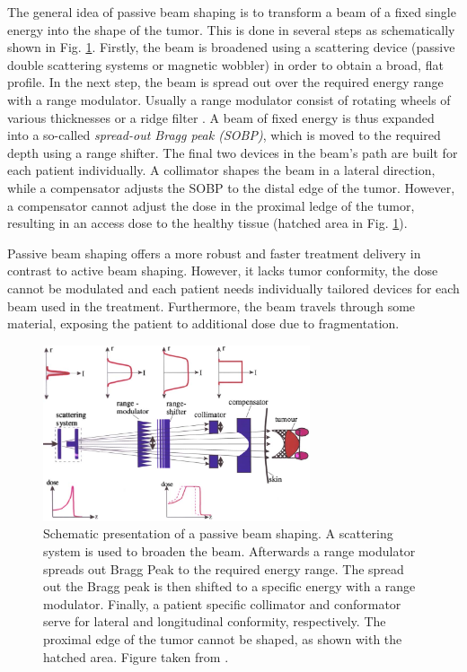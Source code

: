 The general idea of passive beam shaping is to transform a beam of a fixed single energy into the shape of the tumor. This is done in several steps as schematically shown in Fig. \ref{passive}. Firstly, the beam is broadened using a scattering device (passive double scattering systems or magnetic wobbler)
in order to obtain a broad, flat profile. In the next step, the beam is spread out over the required energy range with a range modulator. Usually a range modulator consist of rotating wheels of various thicknesses or a ridge filter \cite{Chu1993}. A beam of fixed energy is thus expanded into a so-called \textit{spread-out Bragg peak (SOBP)}, which is moved to the required depth using a range shifter. The final two devices in the beam's path are built for each patient individually. A collimator shapes the beam in a lateral direction, while a compensator adjusts the SOBP to the distal edge of the tumor. However, a compensator cannot adjust the dose in the proximal ledge of the tumor, resulting in an access dose to the healthy tissue (hatched area in Fig. \ref{passive}).
 
Passive beam shaping offers a more robust and faster treatment delivery in contrast to active beam shaping. However, it lacks tumor conformity, the dose cannot be modulated and each patient needs individually tailored devices for each beam used in the treatment.
 Furthermore, the beam travels through some material, exposing the patient to additional dose due to fragmentation.

 \newpage
 
\begin{figure}[H]
\begin{center}
\includegraphics[width=0.7\textwidth]{./Fundamentals/Images/deliverypassive.png}
\caption{Schematic presentation of a passive beam shaping. A scattering system is used to broaden the beam. Afterwards a range modulator spreads out Bragg Peak to the required energy range.
The spread out the Bragg peak is then shifted to a specific energy with a range modulator. Finally, a patient specific collimator and conformator serve for lateral and longitudinal conformity, respectively.
The proximal edge of the tumor cannot be shaped, as shown with the hatched area. Figure taken from \cite{Schardt2010}.}
\label{passive}
\end{center}
\end{figure}

